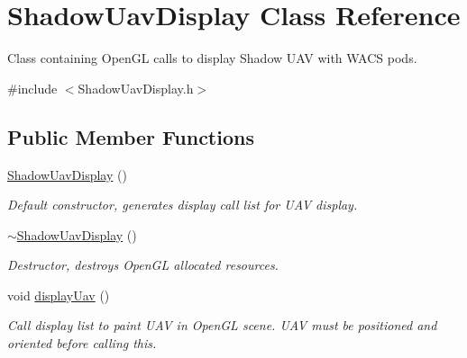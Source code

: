 \hypertarget{class_shadow_uav_display}{
\section{ShadowUavDisplay Class Reference}
\label{class_shadow_uav_display}
}


Class containing OpenGL calls to display Shadow UAV with WACS pods.  




{\ttfamily \#include $<$ShadowUavDisplay.h$>$}

\subsection*{Public Member Functions}
\begin{DoxyCompactItemize}
\item 
\hypertarget{class_shadow_uav_display_a7504aa5d4144589f3ade573247df92f6}{
\hyperlink{class_shadow_uav_display_a7504aa5d4144589f3ade573247df92f6}{ShadowUavDisplay} ()}
\label{class_shadow_uav_display_a7504aa5d4144589f3ade573247df92f6}

\begin{DoxyCompactList}\small\item\em Default constructor, generates display call list for UAV display. \end{DoxyCompactList}\item 
\hypertarget{class_shadow_uav_display_ad2804832e84626776a6b3ddcb7d05646}{
\hyperlink{class_shadow_uav_display_ad2804832e84626776a6b3ddcb7d05646}{$\sim$ShadowUavDisplay} ()}
\label{class_shadow_uav_display_ad2804832e84626776a6b3ddcb7d05646}

\begin{DoxyCompactList}\small\item\em Destructor, destroys OpenGL allocated resources. \end{DoxyCompactList}\item 
void \hyperlink{class_shadow_uav_display_ae0f3a3307ce300338edc19590941f21c}{displayUav} ()
\begin{DoxyCompactList}\small\item\em Call display list to paint UAV in OpenGL scene. UAV must be positioned and oriented before calling this. \end{DoxyCompactList}\end{DoxyCompactItemize}
